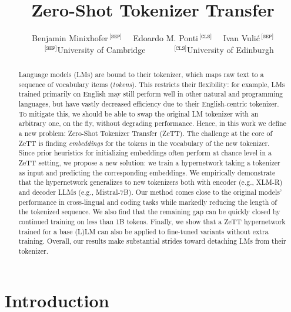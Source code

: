 \documentclass{article}
\title{Zero-Shot Tokenizer Transfer}
\author{%
  Benjamin Minixhofer$ \, ^{\texttt{[SEP]}}$ \, \,  Edoardo M. Ponti$ \, ^{\texttt{[CLS]}}$ \, \,  Ivan Vuli\'c$ \, ^{\texttt{[SEP]}}$\\
  $~~~~~~~^{\texttt{[SEP]}}$University of Cambridge~~~~~~~$^{\texttt{[CLS]}}$University of Edinburgh
}
\begin{document}
\maketitle


\begin{abstract}

Language models (LMs) are bound to their tokenizer, which maps raw text to a sequence of vocabulary items (\textit{tokens}).
This restricts their flexibility: for example, LMs trained primarily on English may still perform well in other natural and programming languages, but have vastly decreased efficiency due to their English-centric tokenizer.
To mitigate this, 
we should be able to swap
the original LM tokenizer with an arbitrary one, on the fly, without degrading performance.
Hence, in this work we define a new problem: Zero-Shot Tokenizer Transfer (ZeTT). 
The challenge at the core of ZeTT is finding \textit{embeddings} for the tokens in the vocabulary of the new tokenizer.
Since prior heuristics for initializing embeddings often perform at chance level in a ZeTT setting, 
we propose a new solution: we train a hypernetwork taking a tokenizer as input and predicting the corresponding embeddings.
We empirically demonstrate that the hypernetwork generalizes to new tokenizers both with encoder (e.g., XLM-R) and decoder LLMs (e.g., Mistral-7B). Our method comes close to the original models' performance in cross-lingual and coding tasks while markedly reducing the length of the tokenized sequence.
We also find that the remaining gap can be quickly closed by continued training on less than 1B tokens. Finally, we show that a ZeTT hypernetwork trained for a base (L)LM can also be applied to fine-tuned variants without extra training. Overall, our results make substantial strides toward detaching LMs from their tokenizer.

\end{abstract}

\section{Introduction}
\end{document}
